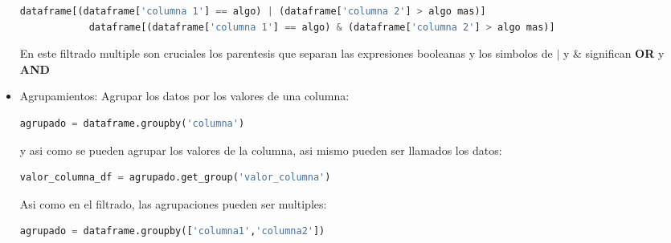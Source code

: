 \documentclass{article}
\begin{document}
\begin{itemize}
        \begin{lstlisting}[language=Python, caption= Filtrado Booleano multiple]
            dataframe[(dataframe['columna 1'] == algo) | (dataframe['columna 2'] > algo mas)]
            dataframe[(dataframe['columna 1'] == algo) & (dataframe['columna 2'] > algo mas)]
        \end{lstlisting}
        En este filtrado multiple son cruciales los parentesis que separan las expresiones booleanas y los simbolos de \(|\) y \& significan \textbf{OR} y \textbf{AND}
    \item Agrupamientos: Agrupar los datos por los valores de una columna:
        \begin{lstlisting}[language=Python, caption= Agrupamiento]
            agrupado = dataframe.groupby('columna')
        \end{lstlisting}
        y asi como se pueden agrupar los valores de la columna, asi mismo pueden ser llamados los datos:
        \begin{lstlisting}[language=Python, caption= Obtencion de grupo]
        valor_columna_df = agrupado.get_group('valor_columna')
        \end{lstlisting}
        Asi como en el filtrado, las agrupaciones pueden ser multiples:
        \begin{lstlisting}[language=Python, caption= Agrupamiento multiple]
            agrupado = dataframe.groupby(['columna1','columna2'])
        \end{lstlisting}
\end{itemize}
\end{document}
